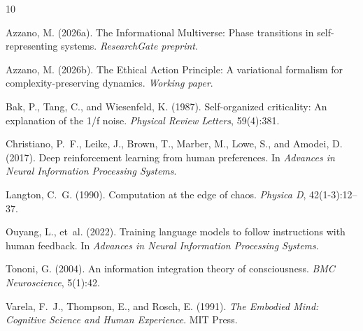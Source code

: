 \documentclass[11pt,a4paper]{article}
\begin{document}

\begin{thebibliography}{10}

Azzano, M. (2026a).
\newblock The Informational Multiverse: Phase transitions in
self-representing systems.
\newblock \emph{ResearchGate preprint}.

Azzano, M. (2026b).
\newblock The Ethical Action Principle: A variational formalism for
complexity-preserving dynamics.
\newblock \emph{Working paper}.

Bak, P., Tang, C., and Wiesenfeld, K. (1987).
\newblock Self-organized criticality: An explanation of the 1/f noise.
\newblock \emph{Physical Review Letters}, 59(4):381.

Christiano, P.~F., Leike, J., Brown, T., Marber, M., Lowe, S., and
Amodei, D. (2017).
\newblock Deep reinforcement learning from human preferences.
\newblock In \emph{Advances in Neural Information Processing Systems}.

Langton, C.~G. (1990).
\newblock Computation at the edge of chaos.
\newblock \emph{Physica D}, 42(1-3):12--37.

Ouyang, L., et~al. (2022).
\newblock Training language models to follow instructions with human
feedback.
\newblock In \emph{Advances in Neural Information Processing Systems}.

Tononi, G. (2004).
\newblock An information integration theory of consciousness.
\newblock \emph{BMC Neuroscience}, 5(1):42.

Varela, F.~J., Thompson, E., and Rosch, E. (1991).
\newblock \emph{The Embodied Mind: Cognitive Science and Human
Experience}.
\newblock MIT Press.

\end{thebibliography}
\end{document}
